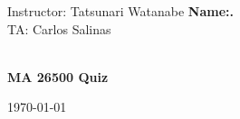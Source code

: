 \documentclass[10pt,letterpaper,addpoints]{exam}%
\begin{document}




\noindent Instructor: Tatsunari Watanabe
\hfill \textbf{Name:\underline{\phantom{My name way too long}}.}\\
\noindent TA: Carlos Salinas
\\\\
\begin{center}
  {\Large \textbf{MA 26500 \quad Quiz \examnum}}

  \bigskip

  \today
\end{center}

\end{document}
